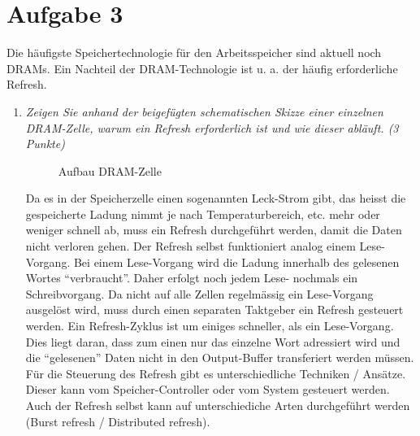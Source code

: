 \documentclass[10pt]{article}
\begin{document}
\newpage
\section*{Aufgabe 3}
Die häufigste Speichertechnologie für den Arbeitsspeicher sind aktuell noch DRAMs. Ein Nachteil der DRAM-Technologie ist u. a. der häufig erforderliche Refresh.

\begin{enumerate}[label=\alph*)]
	\item
		\textit{Zeigen Sie anhand der beigefügten schematischen Skizze einer einzelnen DRAM-Zelle, warum ein Refresh erforderlich ist und wie dieser abläuft. (3 Punkte)}
		
	\begin{figure}[htbp]
		\centering \leavevmode
		\epsfxsize=150pt
		\caption{Aufbau DRAM-Zelle}
	\end{figure}
Da es in der Speicherzelle einen sogenannten Leck-Strom gibt, das heisst die gespeicherte Ladung nimmt je nach Temperaturbereich, etc. mehr oder weniger schnell ab, muss ein Refresh durchgeführt werden, damit die Daten nicht verloren gehen. Der Refresh selbst funktioniert analog einem Lese-Vorgang. Bei einem Lese-Vorgang wird die Ladung innerhalb des gelesenen Wortes "`verbraucht"'. Daher erfolgt noch jedem Lese- nochmals ein Schreibvorgang. Da nicht auf alle Zellen regelmässig ein Lese-Vorgang ausgelöst wird, muss durch einen separaten Taktgeber ein Refresh gesteuert werden. Ein Refresh-Zyklus ist um einiges schneller, als ein Lese-Vorgang. Dies liegt daran, dass zum einen nur das einzelne Wort adressiert wird und die "`gelesenen"' Daten nicht in den Output-Buffer transferiert werden müssen. Für die Steuerung des Refresh gibt es unterschiedliche Techniken / Ansätze. Dieser kann vom Speicher-Controller oder vom System gesteuert werden. Auch der Refresh selbst kann auf unterschiediche Arten durchgeführt werden (Burst refresh / Distributed refresh).
	
\end{enumerate}
\end{document}
